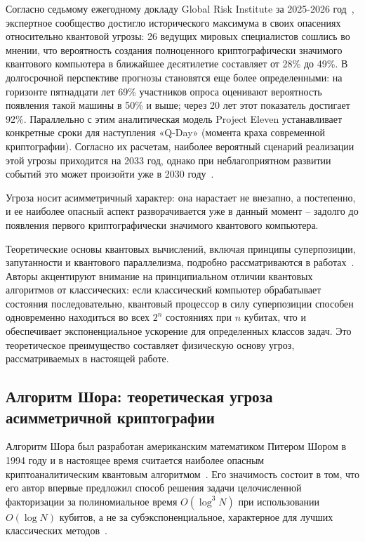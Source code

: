\documentclass{itmo-vkr}
\begin{document}
	Согласно седьмому ежегодному докладу Global Risk Institute за 2025-2026 год~\cite{mosca2025timeline}, экспертное сообщество достигло исторического максимума в своих опасениях относительно квантовой угрозы: 26 ведущих мировых специалистов сошлись во мнении, что вероятность создания полноценного криптографически значимого квантового компьютера в ближайшее десятилетие составляет от 28\% до 49\%. В долгосрочной перспективе прогнозы становятся еще более определенными: на горизонте пятнадцати лет 69\% участников опроса оценивают вероятность появления такой машины в 50\% и выше; через 20 лет этот показатель достигает 92\%. Параллельно с этим аналитическая модель Project Eleven устанавливает конкретные сроки для наступления «Q-Day» (момента краха современной криптографии). Согласно их расчетам, наиболее вероятный сценарий реализации этой угрозы приходится на 2033 год, однако при неблагоприятном развитии событий это может произойти уже в 2030 году~\cite{projecteleven2025qday}.
	
	Угроза носит асимметричный характер: она нарастает не внезапно, а постепенно, и ее наиболее опасный аспект разворачивается уже в данный момент -- задолго до появления первого криптографически значимого квантового компьютера.
	
	Теоретические основы квантовых вычислений, включая принципы суперпозиции, запутанности и квантового параллелизма, подробно рассматриваются в работах~\cite{klucharyov-osnovy-kvantovyh,bukashkin2023quantum}. Авторы акцентируют внимание на принципиальном отличии квантовых алгоритмов от классических: если классический компьютер обрабатывает состояния последовательно, квантовый процессор в силу суперпозиции способен одновременно находиться во всех $2^n$ состояниях при $n$ кубитах, что и обеспечивает экспоненциальное ускорение для определенных классов задач. Это теоретическое преимущество составляет физическую основу угроз, рассматриваемых в настоящей работе.
	
	\subsection{Алгоритм Шора: теоретическая угроза асимметричной криптографии}
	
	Алгоритм Шора был разработан американским математиком Питером Шором в 1994 году и в настоящее время считается наиболее опасным криптоаналитическим квантовым алгоритмом~\cite{1994Shor}. Его значимость состоит в том, что его автор впервые предложил способ решения задачи целочисленной факторизации за полиномиальное время $O(\log^3 N)$ при использовании $O(\log N)$ кубитов, а не за субэкспоненциальное, характерное для лучших классических методов~\cite{kvantovye-algoritmy-shor-grover,borisova2023shor}.
	
\end{document}
